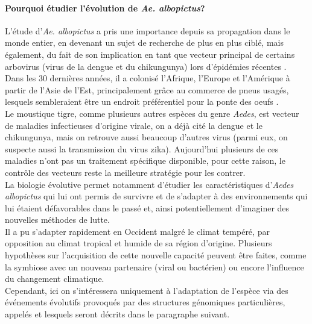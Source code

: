 \documentclass[10pt]{article}
\begin{document}
\bigskip

\paragraph{Pourquoi étudier l'évolution de \textit{Ae. albopictus}?} L'étude d'\textit{Ae. albopictus} a pris une importance depuis sa propagation dans le monde entier, en devenant un sujet de recherche de plus en plus ciblé, mais également, du fait de son implication en tant que vecteur principal de certains arbovirus (virus de la dengue et du chikungunya) lors d'épidémies récentes \cite{paupy_aedes_2009}. \\
Dans les 30 dernières années, il a colonisé l'Afrique, l'Europe et l'Amérique à partir de l'Asie de l'Est, principalement grâce au commerce de pneus usagés, lesquels sembleraient être un endroit préférentiel pour la ponte des oeufs \cite{porretta_glacial_2012}\cite{Reiter1998AedesAA}.  \\

Le moustique tigre, comme plusieurs autres espèces du genre \textit{Aedes}, est vecteur de maladies infectieuses  d'origine virale, on a déjà cité la dengue et le chikungunya, mais on retrouve aussi beaucoup d'autres virus \cite{gratz_critical_2004}\cite{mckenzie_aedes_2019} (parmi eux, on suspecte aussi la transmission du virus zika). Aujourd'hui plusieurs de ces maladies n'ont pas un traitement spécifique disponible, pour cette raison, le contrôle des vecteurs reste la meilleure stratégie pour les contrer. \\
La biologie évolutive permet notamment d'étudier les caractéristiques d'\textit{Aedes albopictus} qui lui ont permis de survivre et de s'adapter à des environnements qui lui étaient défavorables dans le passé et, ainsi potentiellement d'imaginer des nouvelles méthodes de lutte. \\
Il a pu s'adapter rapidement en Occident malgré le climat tempéré, par opposition au climat tropical et humide de sa région d'origine. Plusieurs hypothèses sur l'acquisition de cette nouvelle capacité peuvent être faites, comme la symbiose avec un nouveau partenaire (viral ou bactérien) ou encore l'influence du changement climatique. \\
Cependant, ici on s'intéressera uniquement à l'adaptation de l'espèce via des événements évolutifs provoqués par des structures génomiques particulières, appelés \acrfull{et} lesquels seront décrits dans le paragraphe suivant. \\
\end{document}
